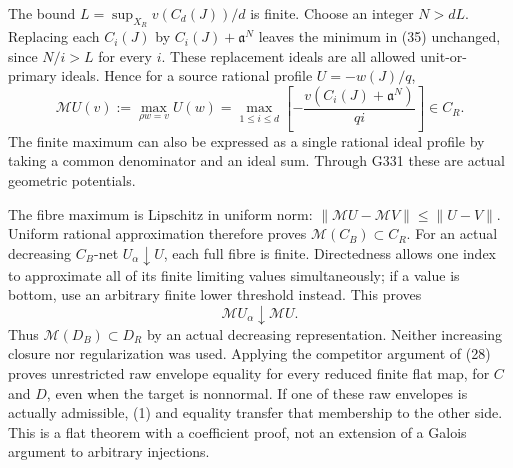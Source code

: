 The bound \(L=\sup_{X_R}v(C_d(J))/d\) is finite.
Choose an integer \(N>dL\). Replacing each \(C_i(J)\) by
\(C_i(J)+\mathfrak a^N\) leaves the minimum in (35)
unchanged, since \(N/i>L\) for every \(i\).
These replacement ideals are all allowed unit-or-primary
ideals. Hence for a source rational profile \(U=-w(J)/q\),
\[
 \mathcal M U(v):=\max_{\rho w=v}U(w)
  =\max_{1\leq i\leq d}
       \left[-\frac{v(C_i(J)+\mathfrak a^N)}{qi}\right]\in C_R.
                                                               \tag{36}
\]
The finite maximum can also be expressed as a single rational
ideal profile by taking a common denominator and an ideal sum.
Through G331 these are actual geometric potentials.

The fibre maximum is Lipschitz in uniform norm:
\(\|\mathcal M U-\mathcal M V\|\leq\|U-V\|\).
Uniform rational approximation therefore proves
\(\mathcal M(C_B)\subset C_R\).
For an actual decreasing \(C_B\)-net \(U_\alpha\downarrow U\),
each full fibre is finite. Directedness allows one index
to approximate all of its finite limiting values
simultaneously; if a value is bottom, use an arbitrary
finite lower threshold instead. This proves
\[
 \mathcal M U_\alpha\downarrow\mathcal M U .
 \]
Thus \(\mathcal M(D_B)\subset D_R\) by an actual decreasing
representation. Neither increasing closure nor regularization
was used. Applying the competitor argument of (28) proves
unrestricted raw envelope equality for every reduced finite
flat map, for \(C\) and \(D\), even when the target is
nonnormal. If one of these raw envelopes is actually
admissible, (1) and equality transfer that membership to
the other side.
This is a flat theorem with a coefficient proof, not an
extension of a Galois argument to arbitrary injections.

